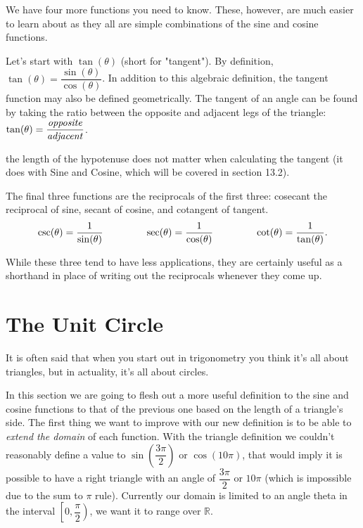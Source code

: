 \documentclass[../book.tex]{subfiles}
\begin{document}
We have four more functions you need to know. These, however, are much easier to learn about as they all are simple combinations of the sine and cosine functions.

Let's start with $\tan(\theta)$ (short for "tangent"). By definition, $\tan(\theta)=\dfrac{\sin(\theta)}{\cos(\theta)}$. In addition to this algebraic definition, the tangent function may also be defined geometrically. The tangent of an angle can be found by taking the ratio between the opposite and adjacent legs of the triangle: $\tan(\theta)=\dfrac{\text{\textit{opposite}}}{\text{\textit{adjacent}}}$.

\begin{remark}
the length of the hypotenuse does not matter when calculating the tangent (it does with Sine and Cosine, which will be covered in section 13.2).
\end{remark}

The final three functions are the reciprocals of the first three: cosecant the reciprocal of sine, secant of cosine, and cotangent of tangent. $$\csc(\theta)=\dfrac{1}{\sin(\theta)} \hspace{15mm} \sec(\theta)=\dfrac{1}{\cos(\theta)}\hspace{15mm} \cot(\theta)=\dfrac{1}{\tan(\theta)}.$$

While these three tend to have less applications, they are certainly useful as a shorthand in place of writing out the reciprocals whenever they come up.

\section{The Unit Circle}
\begin{wrapfigure}{r}{4cm}
\end{wrapfigure}
\noindent It is often said that when you start out in trigonometry you think it's all about triangles, but in actuality, it's all about circles.

In this section we are going to flesh out a more useful definition to the sine and cosine functions to that of the previous one based on the length of a triangle's side. The first thing we want to improve with our new definition is to be able to \textit{extend the domain} of each function. With the triangle definition we couldn't reasonably define a value to $\sin\left(\dfrac{3\pi}{2}\right)$ or $\cos(10\pi)$, that would imply it is possible to have a right triangle with an angle of $\dfrac{3\pi}{2}$ or $10\pi$ (which is impossible due to the sum to $\pi$ rule). Currently our domain is limited to an angle theta in the interval $\left[0,\dfrac{\pi}{2}\right)$, we want it to range over $\mathbb{R}$.
\end{document}
